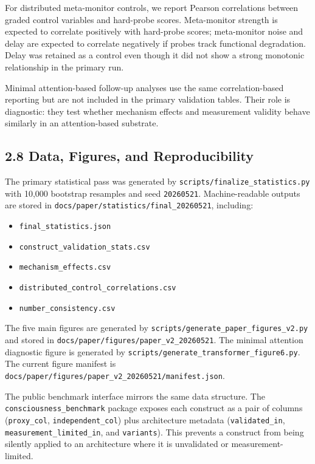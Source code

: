 \documentclass[
  11pt,
  letterpaper,
]{article}
\providecommand{\tightlist}{%
  \setlength{\itemsep}{0pt}\setlength{\parskip}{0pt}}
\begin{document}
For distributed meta-monitor controls, we report Pearson correlations
between graded control variables and hard-probe scores. Meta-monitor
strength is expected to correlate positively with hard-probe scores;
meta-monitor noise and delay are expected to correlate negatively if
probes track functional degradation. Delay was retained as a control
even though it did not show a strong monotonic relationship in the
primary run.

Minimal attention-based follow-up analyses use the same
correlation-based reporting but are not included in the primary
validation tables. Their role is diagnostic: they test whether mechanism
effects and measurement validity behave similarly in an attention-based
substrate.

\subsection{2.8 Data, Figures, and
Reproducibility}\label{data-figures-and-reproducibility}

The primary statistical pass was generated by
\texttt{scripts/finalize\_statistics.py} with 10,000 bootstrap resamples
and seed \texttt{20260521}. Machine-readable outputs are stored in
\texttt{docs/paper/statistics/final\_20260521}, including:

\begin{itemize}
\tightlist
\item
  \texttt{final\_statistics.json}
\item
  \texttt{construct\_validation\_stats.csv}
\item
  \texttt{mechanism\_effects.csv}
\item
  \texttt{distributed\_control\_correlations.csv}
\item
  \texttt{number\_consistency.csv}
\end{itemize}

The five main figures are generated by
\texttt{scripts/generate\_paper\_figures\_v2.py} and stored in
\texttt{docs/paper/figures/paper\_v2\_20260521}. The minimal attention
diagnostic figure is generated by
\texttt{scripts/generate\_transformer\_figure6.py}. The current figure
manifest is
\texttt{docs/paper/figures/paper\_v2\_20260521/manifest.json}.

The public benchmark interface mirrors the same data structure. The
\texttt{consciousness\_benchmark} package exposes each construct as a
pair of columns (\texttt{proxy\_col}, \texttt{independent\_col}) plus
architecture metadata (\texttt{validated\_in},
\texttt{measurement\_limited\_in}, and \texttt{variants}). This prevents
a construct from being silently applied to an architecture where it is
unvalidated or measurement-limited.
\end{document}
